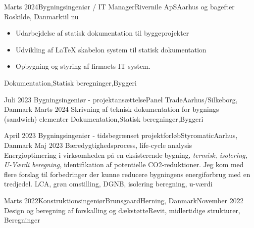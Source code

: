 %
%
\begin{experiences}
\experience
{Marts 2024}{Bygningsingeniør / IT Manager}{Rivernile ApS}{Aarhus og bagefter Roskilde, Danmark}{til nu}
             {
              \begin{itemize}
             \item Udarbejdelse af statisk dokumentation til byggeprojekter
             \item Udvikling af \LaTeX{} skabelon system til statisk dokumentation
             \item Opbygning og styring af firmaets IT system.
             \end{itemize}}{Dokumentation,Statisk beregninger,Byggeri}
 \emptySeparator
 
 \experience
  {Juli 2023}       {Bygningsingeniør - projektansættelse}{Panel Trade}{Aarhus/Silkeborg, Danmark}
  {Marts 2024}
                    {
                    Skrivning af teknisk dokumentation for bygnings (sandwich) elementer}   {Dokumentation,Statisk beregninger,Byggeri}
 \emptySeparator

 \experience
  {April 2023}       {Bygningsingeniør - tidsbegrænset projektforløb}{Styromatic}{Aarhus, Danmark}
  {Maj 2023}
                    { Bæredygtighedsprocess, life-cycle analysis \\
                    Energioptimering i virksomheden på en eksisterende bygning, \textit{termisk, isolering, U-Værdi beregning}, identifikation af potentielle CO2-reduktioner. 
                    Jeg kom med flere forslag til forbedringer der kunne reducere bygningens energiforbrug med en tredjedel. }
                    {LCA, grøn omstilling, DGNB, isolering beregning, u-værdi}
 \emptySeparator

  \experience
  {Marts 2022}{Konstruktionsingeniør}{Brunsgaard}{Herning, Danmark}{November 2022}{
  \\
  Design og beregning af forskalling og dækstøtte}{Revit, midlertidige strukturer, Beregninger}
  \emptySeparator
  

\end{experiences}
